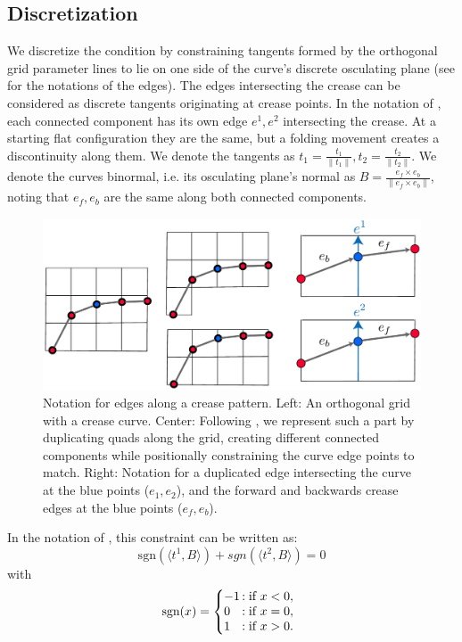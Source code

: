 \subsection{Discretization}
We discretize the condition by constraining tangents formed by the orthogonal grid parameter lines to lie on one side of the curve's discrete osculating plane (see  for the notations of the edges). The edges intersecting the crease can be considered as discrete tangents originating at crease points. In the notation of , each connected component has its own edge $e^1,e^2$ intersecting the crease. At a starting flat configuration they are the same, but a folding movement creates a discontinuity along them. We denote the tangents as $t_1 = \frac{t_1}{\|t_1\|}, t_2 = \frac{t_2}{\|t_2\|}$. We denote the curves binormal, i.e. its osculating plane's normal as $B = \frac{e_f \times e_b}{\|e_f \times e_b\|}$, noting that $e_f,e_b$ are the same along both connected components.

\begin{figure} [h]
	\centering
	\includegraphics[width=\linewidth]{figures/osc_plane_discretization}
	\caption{Notation for edges along a crease pattern. Left: An orthogonal grid with a crease curve. Center: Following \cite{rabi2018shape}, we represent such a part by duplicating quads along the grid, creating different connected components while positionally constraining the curve edge points to match. Right: Notation for a duplicated edge intersecting the curve at the blue points ($e_1,e_2$), and the forward and backwards crease edges at the blue points ($e_f,e_b$). }
	\label{fig:osc_plane_discretization}
\end{figure}

In the notation of , this constraint can be written as:
\begin{equation} \label{eq:folding_const_normalized} 
\text{sgn}(\langle t^1,B\rangle) +  {sgn}(\langle t^2,B\rangle) = 0
\end{equation}
with 
\begin{equation} \label{eq:sign}
\text{sgn}(x) = \left\{
     \begin{array}{@{}l@{\thinspace}l}
       -1  &: \text{if } x < 0, \\
       0 &: \text{if } x = 0, \\
       1 &: \text{if } x > 0. \\
     \end{array}
   \right.
\end{equation}

